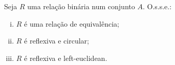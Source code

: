 \begin{exercise}
	Seja $R$ uma relação binária num conjunto $A$. O.s.s.e.:
	\begin{enumerate}[(i)]
		\item $R$ é uma relação de equivalência;
		\item $R$ é reflexiva e circular;
		\item $R$ é reflexiva e left-euclidean.
	\end{enumerate}
\end{exercise}
